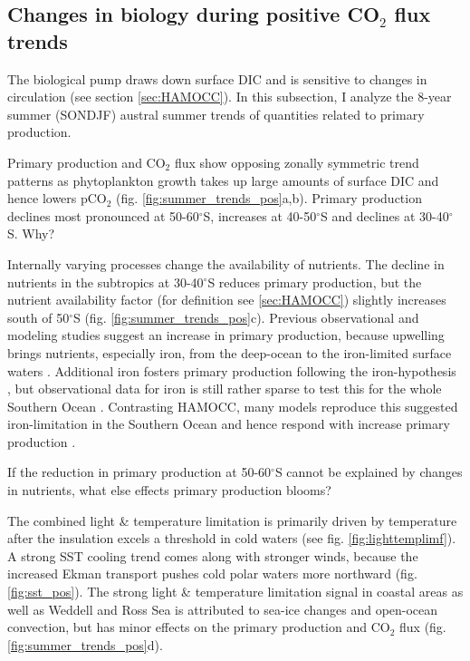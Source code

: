 \subsection{Changes in biology during positive CO$_2$ flux trends}
\label{sec:trends_pos_biology}
The biological pump draws down surface \ac{DIC} and is sensitive to changes in circulation (see section \ref{sec:HAMOCC}). In this subsection, I analyze the 8-year summer (SONDJF) austral summer trends of quantities related to primary production. 
  
Primary production and CO$_2$ flux show opposing zonally symmetric trend patterns as phytoplankton growth takes up large amounts of surface \acs{DIC} and hence lowers pCO$_2$ (fig. \ref{fig:summer_trends_pos}a,b). Primary production declines most pronounced at 50-60$^\circ$S, increases at 40-50$^\circ$S and declines at 30-40$^\circ$S. Why?


Internally varying processes change the availability of nutrients. 
The decline in nutrients in the subtropics at 30-40$^\circ$S reduces primary production, but the nutrient availability factor (for definition see \ref{sec:HAMOCC}) slightly increases south of 50$^\circ$S (fig. \ref{fig:summer_trends_pos}c).
Previous observational and modeling studies suggest an increase in primary production, because upwelling brings nutrients, especially iron, from the deep-ocean to the iron-limited surface waters \citep{Lovenduski2005,Hauck2013,wang2012,Tagliabue2014}. Additional iron fosters primary production following the iron-hypothesis \citep{Martin1990Nature,Martin1990}, but observational data for iron is still rather sparse to test this for the whole Southern Ocean \citep{Tagliabue2014}. Contrasting HAMOCC, many models reproduce this suggested iron-limitation in the Southern Ocean and hence respond with increase primary production \citep{wang2012,Hauck2013}.  \newline

If the reduction in primary production at 50-60$^\circ$S cannot be explained by changes in nutrients, what else effects primary production blooms?

The combined light \& temperature limitation is primarily driven by temperature after the insulation excels a threshold in cold waters (see fig. \ref{fig:lighttemplimf}). A strong \acs{SST} cooling trend comes along with stronger winds, because the increased Ekman transport pushes cold polar waters more northward (fig. \ref{fig:sst_pos}). The strong light \& temperature limitation signal in coastal areas as well as Weddell and Ross Sea is attributed to sea-ice changes and open-ocean convection, but has minor effects on the primary production and CO$_2$ flux (fig. \ref{fig:summer_trends_pos}d). 

